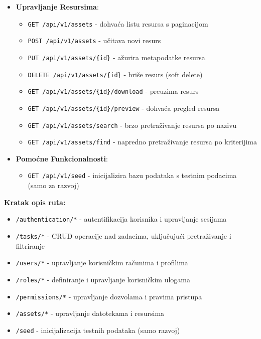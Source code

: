\documentclass[a4paper,12pt]{article}
\begin{document}
\begin{itemize}
    \item \textbf{Upravljanje Resursima}:
        \begin{itemize}
            \item \texttt{GET /api/v1/assets} - dohvaća listu resursa s paginacijom
            \item \texttt{POST /api/v1/assets} - učitava novi resurs
            \item \texttt{PUT /api/v1/assets/\{id\}} - ažurira metapodatke resursa
            \item \texttt{DELETE /api/v1/assets/\{id\}} - briše resurs (soft delete)
            \item \texttt{GET /api/v1/assets/\{id\}/download} - preuzima resurs
            \item \texttt{GET /api/v1/assets/\{id\}/preview} - dohvaća pregled resursa
            \item \texttt{GET /api/v1/assets/search} - brzo pretraživanje resursa po nazivu
            \item \texttt{GET /api/v1/assets/find} - napredno pretraživanje resursa po kriterijima
        \end{itemize}
    
    \item \textbf{Pomoćne Funkcionalnosti}:
        \begin{itemize}
            \item \texttt{GET /api/v1/seed} - inicijalizira bazu podataka s testnim podacima (samo za razvoj)
        \end{itemize}
\end{itemize}

\noindent\textbf{Kratak opis ruta:}

\begin{multicols}{2}
\begin{itemize}
    \item \texttt{/authentication/*} - autentifikacija korisnika i upravljanje sesijama
    \item \texttt{/tasks/*} - CRUD operacije nad zadacima, uključujući pretraživanje i filtriranje
    \item \texttt{/users/*} - upravljanje korisničkim računima i profilima
    \item \texttt{/roles/*} - definiranje i upravljanje korisničkim ulogama
    \item \texttt{/permissions/*} - upravljanje dozvolama i pravima pristupa
    \item \texttt{/assets/*} - upravljanje datotekama i resursima
    \item \texttt{/seed} - inicijalizacija testnih podataka (samo razvoj)
\end{itemize}
\end{multicols}
\end{document}
